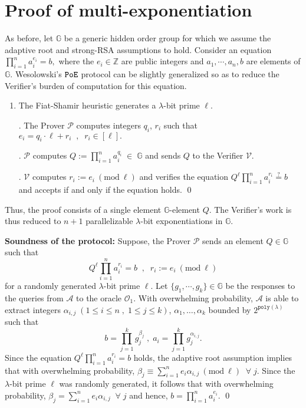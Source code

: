 \documentclass[11pt, lettersize, notitlepage, leqno, footskip=0.6cm]{article}
\newcommand{\bz}{\mathbb Z}
\newcommand{\pl}{\prod\limits}
\newcommand{\slim}{\sum\limits}
\newcommand{\ttt}{\texttt}
\newcommand{\bG}{\mathbb{G}}
\newcommand{\mc}{\mathcal}
\newcommand{\al}{\alpha}
\newcommand{\be}{\beta}
\newcommand{\lam}{\lambda}
\newcommand{\mP}{\mc{P}}
\newcommand{\A}{\mc{A}}
\newcommand{\V}{\mc{V}}
\newcommand{\vs}{\vspace{-0.15cm}}
\newcommand{\noin}{\noindent}
\newcommand{\op}{overwhelming probability}
\newcommand{\sta}{\stackrel{?}{=}}
\newcommand{\Mod}[1]{\ (\mathrm{mod}\ #1)}
\numberwithin{equation}{section}
\begin{document}
{{\section{\fontsize{11}{11} \selectfont Proof of multi-exponentiation} \label{sec:multexp}

As before, let $\bG$ be a generic hidden order group for which we assume the adaptive root and strong-RSA assumptions to hold. Consider an equation $\pl_{i=1}^n a_i^{e_i} = b,$ where the $e_i\in\bz$ are public integers and $a_1,\cdots,a_n, b$ are elements of $\bG$. Wesolowski's $\tt{PoE}$ protocol can be slightly generalized so as to reduce the Verifier's burden of computation for this equation. 

\begin{enumerate}[wide, labelwidth=!, labelindent=0pt]\vs \item The Fiat-Shamir heuristic generates a $\lam$-bit prime $\ell$.

\noin 2. The Prover $\mP$ computes integers $q_i$, $r_i$ such that $e_i = q_i\cdot \ell + r_i\;\;,\;\; r_i\in[\ell] .$

\noin 3. $\mP$ computes $Q:= \pl_{i=1}^n a_i^{q_i}\;\in\;\bG$ and sends $Q$ to the Verifier $\V$.

\noin 4. $\V$ computes $r_i:= e_i\Mod{\ell}$ and verifies the equation $ Q^{\ell}\prod_{i=1}^n a_i^{r_i} \sta b $ and accepts if and only if the equation holds. \qed  \end{enumerate}

Thus, the proof consists of a single element $\bG$-element $Q$. The Verifier's work is thus reduced to $n+1$ parallelizable $\lam$-bit exponentiations in $\bG$.\vspace{0.15cm}  

\noin \textbf{Soundness of the protocol:} Suppose, the Prover $\mP$ sends an element $Q\in\bG$ such that \vs $$Q^{\ell}\pl_{i=1}^n a_i^{r_i} = b\;\;,\;\;r_i:= e_i\Mod{\ell}$$ for a randomly generated $\lam$-bit prime $\ell$. Let $\{g_1,\cdots,g_k\}\in \bG$ be the responses to the queries from $\A$ to the oracle $\mc{O}_1$. With \op, $\A$ is able to extract integers $\al_{i,j}\; (1\leq i \leq n\;,\;1\leq j \leq k)$, $\al_1,\dots, \al_k$ bounded by $2^{\ttt{poly}(\lam)}$ such that \vs $$b = \pl_{j=1}^k g_j^{\be_j}\;,\;a_i = \pl_{j=1}^k g_j^{\al_{i,j}} .$$ Since the equation $Q^{\ell}\pl_{i=1}^n a_i^{r_i} = b $ holds, the adaptive root assumption implies that with \op, $\be_j\equiv \slim_{i=1}^n e_i\al_{i, j}\Mod{\ell}\;\;\forall\; j.$ Since the $\lam$-bit prime $\ell$ was randomly generated, it follows that with \op, $ \be_j = \slim_{i=1}^n e_i\al_{i, j}\;\;\forall\; j$ and hence, $b = \pl_{i=1}^n a_i^{e_i}$. \qed

}}
\end{document}
